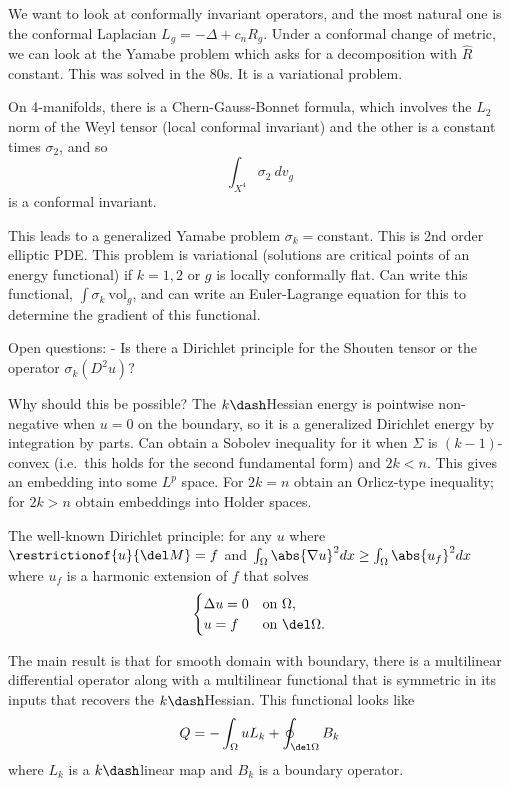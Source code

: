 We want to look at conformally invariant operators, and the most natural
one is the conformal Laplacian \(L_g = -\Delta +c_n R_g\). Under a
conformal change of metric, we can look at the Yamabe problem which asks
for a decomposition with \(\hat R\) constant. This was solved in the
80s. It is a variational problem.

On 4-manifolds, there is a Chern-Gauss-Bonnet formula, which involves
the \(L_2\) norm of the Weyl tensor (local conformal invariant) and the
other is a constant times \(\sigma_2\), and so \[
\int_{X^4} \sigma_2 ~dv_g
\] is a conformal invariant.

This leads to a generalized Yamabe problem
\(\sigma_k = \text{constant}\). This is 2nd order elliptic PDE. This
problem is variational (solutions are critical points of an energy
functional) if \(k=1,2\) or \(g\) is locally conformally flat. Can write
this functional, \(\int \sigma_k ~\mathrm{vol}_g\), and can write an
Euler-Lagrange equation for this to determine the gradient of this
functional.

Open questions: - Is there a Dirichlet principle for the Shouten tensor
or the operator \(\sigma_k(D^2u)\)?

Why should this be possible? The \(k\dash\)Hessian energy is pointwise
non-negative when \(u=0\) on the boundary, so it is a generalized
Dirichlet energy by integration by parts. Can obtain a Sobolev
inequality for it when \(\Sigma\) is \((k-1)\)-convex (i.e.~this holds
for the second fundamental form) and \(2k<n\). This gives an embedding
into some \(L^p\) space. For \(2k=n\) obtain an Orlicz-type inequality;
for \(2k>n\) obtain embeddings into Holder spaces.

The well-known Dirichlet principle: for any \(u\) where
\(\restrictionof{u}{\del M} = f\) and
\(\int_\Omega \abs{\nabla u}^2 dx \geq \int_\Omega \abs{u_f}^2 dx\)
where \(u_f\) is a harmonic extension of \(f\) that solves \[
\begin{cases}
\Delta u = 0 & \text{on}~\Omega, \\
u=f & \text{on}~\del\Omega.
\end{cases}
\]

The main result is that for smooth domain with boundary, there is a
multilinear differential operator along with a multilinear functional
that is symmetric in its inputs that recovers the \(k\dash\)Hessian.
This functional looks like \[
Q = -\int_\Omega u L_k + \oint_{\del \Omega} B_k
\] where \(L_k\) is a \(k\dash\)linear map and \(B_k\) is a boundary
operator.

